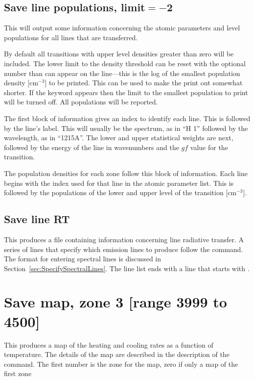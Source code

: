 \subsection{Save line populations, limit$=-$2}

This will output some information concerning the atomic parameters and
level populations for all lines that are transferred.

By default all transitions with upper level densities greater than zero
will be included.  The lower limit to the density threshold can be reset
with the optional number than can appear on the line---this is the log of
the smallest population density [cm$^{-3}$] to be printed.  This can be used
to make the print out somewhat shorter.
If the keyword  appears then
the limit to the smallest population to print will be turned off.
All
populations will be reported.

The first block of information gives an index to identify each line.
This is followed by the line's label.  This will usually be the spectrum,
as in ``H  1'' followed by the wavelength, as in ``1215A''.  The lower and
upper statistical weights are next, followed by the energy of the line in
wavenumbers and the $gf$ value for the transition.

The population densities for each zone follow this block of information.
Each line begins with the index used for that line in the atomic parameter
list.  This is followed by the populations of the lower and upper level
of the transition [cm$^{-3}$].

\subsection{Save line RT}

This produces a file containing information concerning line radiative
transfer. A series of lines that specify which emission lines to produce
follow the command. The format for entering spectral lines is discussed in
Section~\ref{sec:SpecifySpectralLines}. The line list ends with a line that
starts with .

\section{Save map, zone 3 [range 3999 to 4500]}

This produces a map of the heating and cooling rates as a function of
temperature.  The details of the map are described in the description of
the  command.
The first number is the zone
for the map, zero if only a map of the first zone

